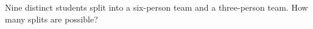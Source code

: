 Nine distinct students split into a six-person team and a three-person team. How many splits are possible?
